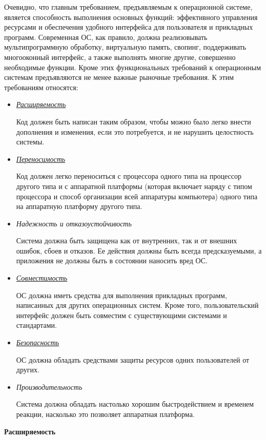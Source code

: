 Очевидно, что главным требованием, предъявляемым к операционной системе, является способность выполнения основных функций: эффективного управления ресурсами и обеспечения удобного интерфейса для пользователя и прикладных программ. Современная ОС, как правило, должна реализовывать мультипрограммную обработку, виртуальную память, свопинг, поддерживать многооконный интерфейс, а также выполнять многие другие, совершенно необходимые функции. Кроме этих функциональных требований к операционным системам предъявляются не менее важные рыночные требования. К этим требованиям относятся:
\begin{itemize}
   \item \hyperlink{opr1_REQ}{\textit{Расширяемость}}

         Код должен быть написан таким образом, чтобы можно было легко внести дополнения и изменения, если это потребуется, и не нарушить целостность системы.
   \item \hyperlink{opr2_REQ}{\textit{Переносимость}}

         Код должен легко переноситься с процессора одного типа на процессор другого типа и с аппаратной платформы (которая включает наряду с типом процессора и способ организации всей аппаратуры компьютера) одного типа на аппаратную платформу другого типа.
   \item \textit{Надежность и отказоустойчивость}

         Система должна быть защищена как от внутренних, так и от внешних ошибок, сбоев и отказов. Ее действия должны быть всегда предсказуемыми, а приложения не должны быть в состоянии наносить вред ОС.
   \item \hyperlink{opr3_REQ}{\textit{Совместимость}}

         ОС должна иметь средства для выполнения прикладных программ, написанных для других операционных систем. Кроме того, пользовательский интерфейс должен быть совместим с существующими системами и стандартами.
   \item \hyperlink{opr4_REQ}{\textit{Безопасность}}

         ОС должна обладать средствами защиты ресурсов одних пользователей от других.
   \item \textit{Производительность}

         Система должна обладать настолько хорошим быстродействием и временем реакции, насколько это позволяет аппаратная платформа.
\end{itemize}

\hypertarget{opr1_REQ}{\textbf{Расширяемость}}

